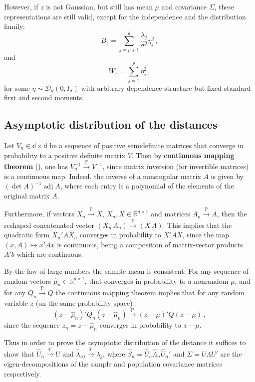 \documentclass[a4paper,14pt]{article}
\newcommand{\pr}{\mathop{\mathbb{P}}\nolimits}
\newcommand{\prto}{\overset{\pr}{\to}}
\newcommand{\Real}{\mathbb{R}}
\begin{document}
However, if $z$ is not Gaussian, but still has mean $\mu$ and covariance $\Sigma$,
these representations are still valid, except for the independence and the distribution
family:
$$ B_z = \sum_{j=p+1}^d \frac{\lambda_j}{\sigma^2} \eta_j^2\,,$$
and
$$ W_z = \sum_{j=1}^p \eta_j^2\,,$$
for some $\eta \sim \mathcal{D}_d(0, I_d)$ with arbitrary dependence structure but fixed
standard first and second moments.


\subsection{Asymptotic distribution of the distances} %
\label{sub:asymptotic_distribution_of_the_distances}

Let $V_n\in\mathbb{d\times d}$ be a sequence of positive semidefinite matrices that
converge in probability to a positive definite matrix $V$. Then by \textbf{continuous
mapping theorem} (\cite{vaart2000}), one has $V_n^{-1} \prto V^{-1}$, since matrix
inversion (for invertible matrices) is a continuous map. Indeed, the inverse of
a nonsingular matrix $A$ is given by $(\mathop{\text{det}}A)^{-1}\mathop{\text{adj}}A$,
where each entry is a polynomial of the elements of the original matrix $A$.

Furthermore, if vectors $X_n\prto X$, $X_n, X \in\Real^{d\times1}$ and matrices
$A_n\prto A$, then the reshaped concatenated vector $(X_n \,A_n) \prto (X\,A)$. This
implies that the quadratic form $X_n'A X_n$ converges in probability to $X'AX$, since
the map $(x, A) \mapsto x'Ax$ is continuous, being a composition of matrix-vector
products $A'b$ which are continuous.

By the law of large numbers the sample mean is consistent:
For any sequence of random vectors $\hat{\mu}_n\in\Real^{d\times1}$, that
converges in probability to a nonrandom $\mu$, and for any $Q_n \prto Q$ the continuous
mapping theorem implies that for any random variable $z$ (on the same probability
space)
$$ (z-\hat{\mu}_n)'Q_n (z-\hat{\mu}_n) \prto (z-\mu)'Q(z-\mu) \,,$$
since the sequence $z_n = z - \hat{\mu}_n$ converges in probability to $z - \mu$.

Thus in order to prove the asymptotic distribution of the distance it suffices to show
that $\hat{U}_n \prto U $ and $\hat{\lambda}_{nj} \prto \lambda_j $,
where $\hat{S}_n = \hat{U}_n \hat{\Lambda}_n \hat{U}_n'$ and $\Sigma = U \Lambda U'$ are
the eigen-decompositions of the sample and population covariance matrices respectively.
\end{document}
